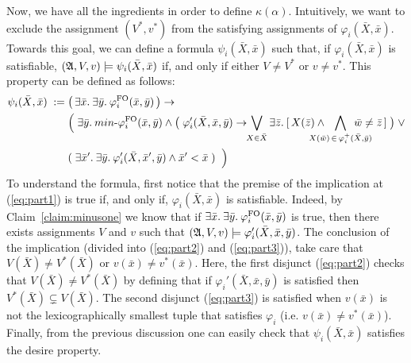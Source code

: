 Now, we have all the ingredients in order to define $\kappa(\alpha)$. 
Intuitively, we want to exclude the assignment $(V^*, v^*)$ from the satisfying assignments of $\varphi_i(\bar{X},\bar{x})$.
Towards this goal, we can define a formula $\psi_i(\bar{X},\bar{x})$ such that, if $\varphi_i(\bar{X}, \bar{x})$ is satisfiable, $(\mathfrak{A}, V, v) \models \psi_i(\bar{X},\bar{x})$ if, and only if either $V \neq V^*$ or $v \neq v^*$. 
This property can be defined as follows:
\begin{align}
\psi_i(\bar{X},\bar{x}) \; := \;  &\big( \, \ex{\bar{x}} \ex{\bar{y}} \varphi^{\fo}_i(\bar{x},\bar{y}) \,\big) \rightarrow  \label{eq:part1} \\
&\Big( \; 
\ex{\bar{y}} \text{$min$-}\varphi^{\fo}_i(\bar{x}, \bar{y}) \wedge \big( \; \varphi_i'(\bar{X},\bar{x}, \bar{y})  \rightarrow \!\! \bigvee_{X \in \bar{X}} \ex{\bar{z}} [ \, X(\bar{z}) \wedge   \!\!\!\!\!\!\!\!\!\! \bigwedge\limits_{X(\bar{w}) \, \in \, \varphi^{+}_i(\bar{X},\bar{y})} \!\!\!\!\!\!\!\!\!\!\! \bar{w}\neq\bar{z} \, ] \; \big) \;  \vee   \label{eq:part2} \\ 
&(\; \ex{\bar{x}'} \ex{\bar{y}} \varphi_i'(\bar{X},\bar{x}',\bar{y})\wedge \bar{x}' < \bar{x} \; ) \;\; \Big)  \label{eq:part3}
\end{align}
To understand the formula, first notice that the premise of the implication at (\ref{eq:part1}) is true if, and only if, $\varphi_i(\bar{X}, \bar{x})$ is satisfiable. 
Indeed, by Claim~\ref{claim:minusone} we know that if $\exists{\bar{x}}.\: \exists{\bar{y}}.\: \varphi^{{\rm FO}}_i(\bar{x},\bar{y})$ is true, then there exists assignments $V$ and $v$ such that $(\mathfrak{A},V,v) \models\varphi_i'(\bar{X},\bar{x},\bar{y})$.
The conclusion of the implication (divided into (\ref{eq:part2}) and (\ref{eq:part3})), take care that $V(\bar{X}) \neq V^*(\bar{X})$ or $v(\bar{x}) \neq v^*(\bar{x})$.
Here, the first disjunct (\ref{eq:part2}) checks that $V(\bar{X}) \neq V^*(\bar{X})$ by defining that if $\varphi_i'(\bar{X},\bar{x}, \bar{y})$ is satisfied then $V^*(\bar{X}) \subsetneq V(\bar{X})$. 
The second disjunct (\ref{eq:part3}) is satisfied when $v(\bar{x})$ is not the lexicographically smallest tuple that satisfies $\varphi_i$ (i.e. $v(\bar{x}) \neq v^*(\bar{x})$).
Finally, from the previous discussion one can easily check that $\psi_i(\bar{X},\bar{x})$ satisfies the desire property.

